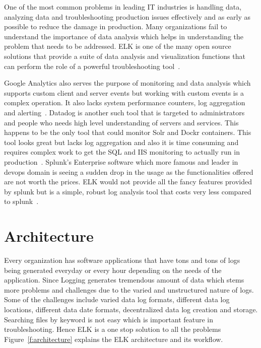 One of the most common problems in leading IT industries is handling data, 
analyzing data and troubleshooting production issues effectively and as early 
as possible to reduce the damage in production. Many organizations fail to 
understand the importance of data analysis which helps in understanding the 
problem that needs to be addressed. ELK is one of the many open source solutions
 that provide a suite of data analysis and visualization functions that can 
 perform the role of a powerful troubleshooting tool~\cite{hid-sp18-410-elk-intro1}. 

 Google Analytics also serves the purpose of monitoring and data
 analysis which supports custom client and server events but working
 with custom events is a complex operation. It also lacks system
 performance counters, log aggregation and
 alerting~\cite{hid-sp18-410-elk-intro2}.  Datadog is another such
 tool that is targeted to administrators and people who needs high
 level understanding of servers and services. This happens to be the
 only tool that could monitor Solr and Dockr containers. This tool
 looks great but lacks log aggregation and also it is time consuming
 and requires complex work to get the SQL and IIS monitoring to
 actually run in production~\cite{hid-sp18-410-elk-intro2}.  Splunk's
 Enterprise software which more famous and leader in devops domain is
 seeing a sudden drop in the usage as the functionalities offered are
 not worth the prices.  ELK would not provide all the fancy features
 provided by splunk but is a simple, robust log analysis tool that
 costs very less compared to splunk~\cite{hid-sp18-410-elk-intro2}.



\section{Architecture}

Every organization has software applications that have tons and tons of logs 
being generated everyday or every hour depending on the needs of the 
application. Since Logging generates tremendous amount of data which stems more 
problems and challenges due to the varied and unstructured nature of logs. Some 
of the challenges include varied data log formats, different data log locations,
 different data date formats, decentralized data log creation and storage. 
 Searching files by keyword is not easy which is important feature in 
 troubleshooting. Hence ELK is a one stop solution to all the problems
~\cite{hid-sp18-410-elk-architecture}  
Figure~\ref{f:architecture} explains the ELK architecture and its workflow.


